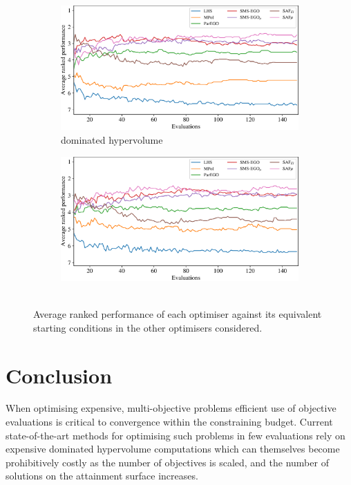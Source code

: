 \documentclass[conference]{IEEEtran}
\DeclareMathOperator*{\igdp}{IGD^{+}}
\newcommand\hpv{dominated hypervolume\xspace}
\begin{document}
\begin{figure}[t]
\begin{subfigure}[b]{\columnwidth}
         \centering
         \includegraphics[width=\columnwidth]{figures/_ranked_performance_plot_hv.pdf}
         \caption{\hpv}
     \end{subfigure}
\begin{subfigure}[b]{\columnwidth}
         \centering
         \includegraphics[width=\columnwidth]{figures/_ranked_performance_plot_igd.pdf}
         \caption{$\igdp$}
     \end{subfigure}
\caption{Average ranked performance of each optimiser against its equivalent starting conditions in the other optimisers considered.}
\label{fig: ranked_plots}
\end{figure}


\section{Conclusion}
\label{sec:conclusion}
When optimising expensive, multi-objective problems efficient use of objective evaluations is critical to convergence within the constraining budget. Current state-of-the-art methods for optimising such problems in few evaluations rely on expensive \hpv computations which can themselves become prohibitively costly as the number of objectives is scaled, and the number of solutions on the attainment surface increases. 
\end{document}
